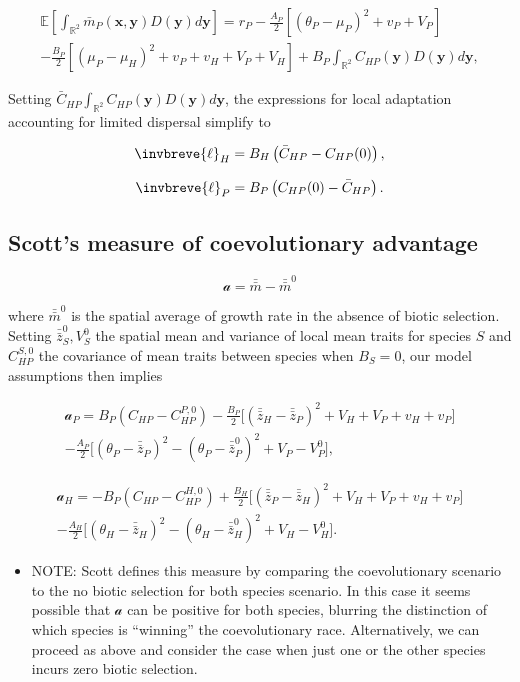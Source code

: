 \documentclass{article}
\begin{document}
\begin{multline}
  \mathbb E\left[\int_{\mathbb R^2}\bar m_P(\pmb x,\pmb y)
  D(\pmb y)d\pmb y\right]= 
  r_P-\frac{A_P}{2}[(\theta_P-\mu_P)^2+v_P+V_P] \\
  -\frac{B_P}{2}[(\mu_P-\mu_H)^2+v_P+v_H+V_P+V_H]
  +B_P\int_{\mathbb R^2}C_{HP}(\pmb y)D(\pmb y)d\pmb y,
\end{multline}

Setting \(\bar C_{HP}\int_{\mathbb R^2}C_{HP}(\pmb y)D(\pmb y)d\pmb y\),
the expressions for local adaptation accounting for limited dispersal
simplify to

\[\invbreve{\ell}_H=B_H\left(\bar C_{HP}-C_{HP}(0)\right),\]

\[\invbreve{\ell}_P=B_P\left(C_{HP}(0)-\bar C_{HP}\right).\]

\hypertarget{scotts-measure-of-coevolutionary-advantage}{%
\subsection{Scott's measure of coevolutionary
advantage}\label{scotts-measure-of-coevolutionary-advantage}}

\[\mathcal a=\bar{\bar m}-\bar{\bar m}^0\]

where \(\bar{\bar m}^0\) is the spatial average of growth rate in the
absence of biotic selection. Setting \(\bar{\bar z}_S^0, V_S^0\) the
spatial mean and variance of local mean traits for species \(S\) and
\(C_{HP}^{S,0}\) the covariance of mean traits between species when
\(B_S=0\), our model assumptions then implies

\begin{multline}
  \mathcal a_P=B_P(C_{HP}-C_{HP}^{P,0})-\frac{B_P}{2}\big[(\bar{\bar z}_H-\bar{\bar z}_P)^2+V_H+V_P+v_H+v_P\big] \\
  -\frac{A_P}{2}\big[(\theta_P-\bar{\bar z}_P)^2-(\theta_P-\bar{\bar z}_P^0)^2+V_P-V_P^0\big],
\end{multline}

\begin{multline}
  \mathcal a_H=-B_P(C_{HP}-C_{HP}^{H,0})+\frac{B_H}{2}\big[(\bar{\bar z}_P-\bar{\bar z}_H)^2+V_H+V_P+v_H+v_P\big] \\
  -\frac{A_H}{2}\big[(\theta_H-\bar{\bar z}_H)^2-(\theta_H-\bar{\bar z}_H^0)^2+V_H-V_H^0\big].
\end{multline}

\begin{itemize}
\tightlist
\item
  NOTE: Scott defines this measure by comparing the coevolutionary
  scenario to the no biotic selection for both species scenario. In this
  case it seems possible that \(\mathcal a\) can be positive for both
  species, blurring the distinction of which species is
  \enquote{winning} the coevolutionary race. Alternatively, we can
  proceed as above and consider the case when just one or the other
  species incurs zero biotic selection.
\end{itemize}
\end{document}
